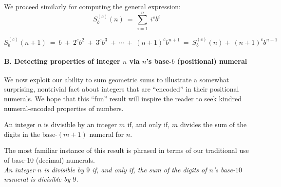 We proceed similarly for computing the general expression: 
\[
S_b^{(c)}(n) \ = \ \sum_{i=1}^n \ i^c b^i
\]

\[
S_b^{(c)}(n+1)
 \ = \
b \ + \ 2^{c} b^2\ + \ 3^{c} b^3 \ + \ \cdots \ + \ (n+1)^{c} b^{n+1}
 \ = \
S_b^{(c)}(n) +  \ (n+1)^{c} b^{n+1}
\]


\paragraph{\small\sf B. Detecting properties of integer $n$ via $n$'s base-$b$ (positional) numeral}

We now exploit our ability to sum geometric sums to illustrate a
somewhat surprising, nontrivial fact about integers that are
``encoded'' in their positional numerals.  We hope that this ``fun''
result will inspire the reader to seek kindred numeral-encoded
properties of numbers.

\begin{prop}
\label{thm:div-by-b-bar}
An integer $n$ is divisible by an integer $m$ if, and only if, $m$
divides the sum of the digits in the base-$(m+1)$ numeral for $n$.
\end{prop}

The most familiar instance of this result is phrased in terms of our
traditional use of base-$10$ (decimal) numerals. \\
{\it An integer $n$ is divisible by $9$ if, and only if, the sum of
  the digits of $n$'s base-$10$ numeral is divisible by $9$.}

\smallskip

